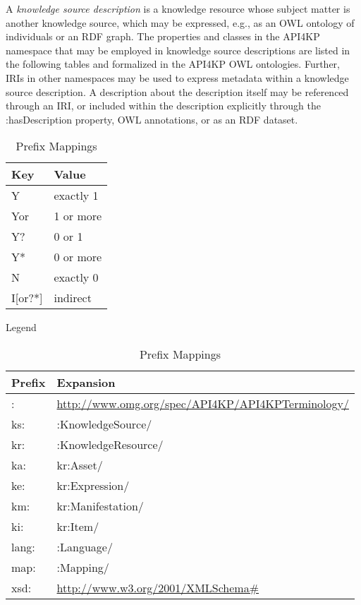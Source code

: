 \documentclass[runningheads]{llncs}
\begin{document}
A \emph{knowledge source description} is a knowledge resource whose subject matter is another knowledge source, which may be expressed, e.g., as an OWL ontology of individuals or an RDF graph. The properties and classes in the API4KP namespace that may be employed in knowledge source descriptions are listed in the following tables and formalized in the API4KP OWL ontologies. Further, IRIs in other namespaces may be used to express metadata within a knowledge source description. A description about the description itself may be referenced through an IRI, or included within the description explicitly through the :hasDescription property,  OWL annotations, or as an RDF dataset\cite{RDF2014b}.
\begin{table}[h]
\begin{minipage}[b]{0.20\linewidth}
\centering
\begin{tabular}{|l|l|}
\hline
\textbf{Key} & \textbf{Value} \\ \hline
Y            & exactly 1      \\ \hline
Yor           & 1 or more      \\ \hline
Y?           & 0 or 1         \\ \hline
Y*           & 0 or more      \\ \hline
N            & exactly 0      \\ \hline
I[or?*]       & indirect      \\ \hline
\end{tabular}
\caption{Legend}
\label{legend}
\end{minipage}
\hspace{0.5cm}
\begin{minipage}[b]{0.70\linewidth}
\centering
\begin{tabular}{|l|l|}
\hline
\textbf{Prefix} & \textbf{Expansion} \\ \hline
:            & \url{http://www.omg.org/spec/API4KP/API4KPTerminology/}      \\ \hline
ks:            & :KnowledgeSource/      \\ \hline
kr:            & :KnowledgeResource/      \\ \hline
ka:            & kr:Asset/      \\ \hline
ke:            & kr:Expression/      \\ \hline
km:            & kr:Manifestation/      \\ \hline
ki:            & kr:Item/      \\ \hline
lang:            & :Language/      \\ \hline
map:            & :Mapping/      \\ \hline
xsd:            & \url{http://www.w3.org/2001/XMLSchema#}     \\ \hline
\end{tabular}
\caption{Prefix Mappings}
\label{abbreviations}
\end{minipage}
\end{table}
\end{document}
